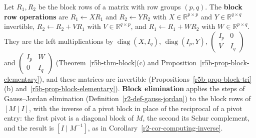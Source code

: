 \documentclass[12pt]{article}
\newcommand{\R}{\mathbb R}
\DeclareMathOperator{\diag}{diag}
\theoremstyle{definition}
\begin{document}
Let \(R_1,R_2\) be the block rows of a matrix with row groups \((p,q)\). The \textbf{block row
operations} are \(R_1\leftarrow XR_1\) and \(R_2\leftarrow YR_2\) with \(X\in\R^{p\times p}\) and
\(Y\in\R^{q\times q}\) invertible, \(R_2\leftarrow R_2+VR_1\) with \(V\in\R^{q\times p}\), and
\(R_1\leftarrow R_1+WR_2\) with \(W\in\R^{p\times q}\). They are the left multiplications by
\(\diag(X,I_q)\), \(\diag(I_p,Y)\), \(\left(\begin{smallmatrix}I_p&0\\V&I_q\end{smallmatrix}\right)\) and
\(\left(\begin{smallmatrix}I_p&W\\0&I_q\end{smallmatrix}\right)\) (Theorem~\ref{r5b-thm-block}(c) and
Proposition~\ref{r5b-prop-block-elementary}), and these matrices are invertible
(Propositions~\ref{r5b-prop-block-tri}(b) and~\ref{r5b-prop-block-elementary}). \textbf{Block
elimination} applies the steps of Gauss--Jordan elimination (Definition~\ref{r2-def-gauss-jordan}) to
the block rows of \([M\mid I]\), with the inverse of a pivot block in place of the reciprocal of a pivot
entry: the first pivot is a diagonal block of \(M\), the second its Schur complement, and the result is
\([I\mid M^{-1}]\), as in Corollary~\ref{r2-cor-computing-inverse}.
\end{document}
